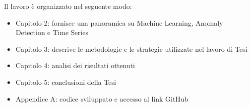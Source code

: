 \vspace{1cm}

Il lavoro \`e organizzato nel seguente modo:
\begin{itemize}

  \item Capitolo 2: fornisce una panoramica su Machine Learning, Anomaly Detection e Time Series
  
  \item Capitolo 3: descrive le metodologie e le strategie utilizzate nel lavoro di Tesi

  \item Capitolo 4: analisi dei risultati ottenuti

  \item Capitolo 5: conclusioni della Tesi

  \item Appendice A: codice sviluppato e accesso al link GitHub
  
\end{itemize}

\vspace{-0.5cm}
\vspace{-0.3cm}
